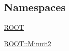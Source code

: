 \subsection*{Namespaces}
\begin{DoxyCompactItemize}
\item 
 \mbox{\hyperlink{namespaceROOT}{R\+O\+OT}}
\item 
 \mbox{\hyperlink{namespaceROOT_1_1Minuit2}{R\+O\+O\+T\+::\+Minuit2}}
\end{DoxyCompactItemize}
